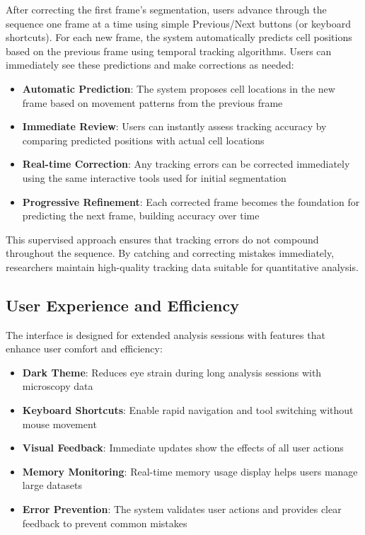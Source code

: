 \documentclass[../cellseek_paper.tex]{subfiles}
\begin{document}
After correcting the first frame's segmentation, users advance through the sequence one frame at a time using simple Previous/Next buttons (or keyboard shortcuts). For each new frame, the system automatically predicts cell positions based on the previous frame using temporal tracking algorithms. Users can immediately see these predictions and make corrections as needed:

\begin{itemize}
  \item \textbf{Automatic Prediction}: The system proposes cell locations in the new frame based on movement patterns from the previous frame
  \item \textbf{Immediate Review}: Users can instantly assess tracking accuracy by comparing predicted positions with actual cell locations
  \item \textbf{Real-time Correction}: Any tracking errors can be corrected immediately using the same interactive tools used for initial segmentation
  \item \textbf{Progressive Refinement}: Each corrected frame becomes the foundation for predicting the next frame, building accuracy over time
\end{itemize}

This supervised approach ensures that tracking errors do not compound throughout the sequence. By catching and correcting mistakes immediately, researchers maintain high-quality tracking data suitable for quantitative analysis.

\subsection{User Experience and Efficiency}

The interface is designed for extended analysis sessions with features that enhance user comfort and efficiency:

\begin{itemize}
  \item \textbf{Dark Theme}: Reduces eye strain during long analysis sessions with microscopy data
  \item \textbf{Keyboard Shortcuts}: Enable rapid navigation and tool switching without mouse movement
  \item \textbf{Visual Feedback}: Immediate updates show the effects of all user actions
  \item \textbf{Memory Monitoring}: Real-time memory usage display helps users manage large datasets
  \item \textbf{Error Prevention}: The system validates user actions and provides clear feedback to prevent common mistakes
\end{itemize}
\end{document}
